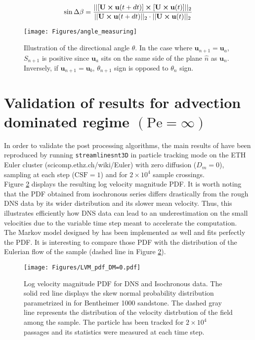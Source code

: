 \begin{equation}
\sin\Delta\beta = \frac{||[\textbf{U}\cross \textbf{u}(t+dt)]\cross[\textbf{U}\cross \textbf{u}(t)]||_2}{||\textbf{U}\cross \textbf{u}(t+dt)||_2 \cdot||\textbf{U}\cross \textbf{u}(t)||_2}
\end{equation}

\begin{figure}
	\centering
	\texttt{[image: Figures/angle\_measuring]}
	\caption{Illustration of the directional angle $\theta$. In the case where $\textbf{u}_{n+1} = \textbf{u}_a$, $S_{n+1}$ is positive since $\textbf{u}_a$ sits on the same side of the plane $\hat{n}$ as $\textbf{u}_n$. Inversely, if $\textbf{u}_{n+1} = \textbf{u}_b$, $\theta_{n+1}$ sign is opposed to $\theta_n$ sign. }
	\label{fig:anglemeasuring}
\end{figure}


\section{Validation of \cite{Meyer2016} results for advection dominated regime $(\mathrm{Pe}=\infty)$}
In order to validate the post processing algorithms, the main results of \cite{Meyer2016} have been reproduced by running \texttt{streamlinesnt3D} in particle tracking mode on the ETH Euler cluster (scicomp.ethz.ch/wiki/Euler) with zero diffusion ($D_m=0$), sampling at each step ($\mathrm{CSF}=1$) and for $2\times 10^4$ sample crossings.\\ 
Figure \ref{fig:lvm_pdf_peinf} displays the resulting log velocity magnitude PDF. 
It is worth noting that the PDF obtained from isochronous series differs drastically from the rough DNS data by its wider distribution and its slower mean velocity.
Thus, this illustrates efficiently how DNS data can lead to an underestimation on the small velocities due to the variable time step meant to accelerate the computation.\\
The Markov model designed by \cite{Meyer2016} has been implemented as well and fits perfectly the PDF.
It is interesting to compare those PDF with the distribution of the Eulerian flow of the sample (dashed line in Figure \ref{fig:lvm_pdf_peinf}).
\begin{figure}
	\centering
	\texttt{[image: Figures/LVM\_pdf\_DM=0.pdf]}
	\caption{Log velocity magnitude PDF for DNS and Isochronous data. The solid red line displays the skew normal probability distribution parametrized in \citet{Meyer2016} for Bentheimer 1000 sandstone. The dashed gray line represents the distribution of the velocity distrbution of the field among the sample. The particle has been tracked for $2\times 10^4$ passages and its statistics were measured at each time step.}
	\label{fig:lvm_pdf_peinf}
\end{figure}

